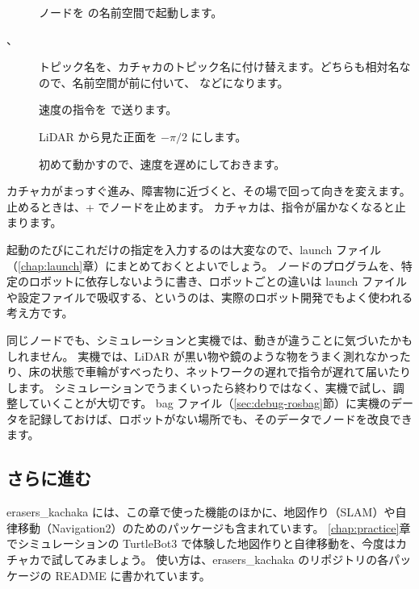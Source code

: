 \begin{description}
  \item[] ノードを  の名前空間で起動します。
  \item[、] トピック名を、カチャカのトピック名に付け替えます。どちらも相対名なので、名前空間が前に付いて、 などになります。
  \item[] 速度の指令を  で送ります。
  \item[] LiDAR から見た正面を $-\pi/2$ にします。
  \item[] 初めて動かすので、速度を遅めにしておきます。
\end{description}

カチャカがまっすぐ進み、障害物に近づくと、その場で回って向きを変えます。
止めるときは、+ でノードを止めます。
カチャカは、指令が届かなくなると止まります。

起動のたびにこれだけの指定を入力するのは大変なので、launch ファイル（\ref{chap:launch}章）にまとめておくとよいでしょう。
ノードのプログラムを、特定のロボットに依存しないように書き、ロボットごとの違いは launch ファイルや設定ファイルで吸収する、というのは、実際のロボット開発でもよく使われる考え方です。

\begin{point}[シミュレーションと実機の違い]
  同じノードでも、シミュレーションと実機では、動きが違うことに気づいたかもしれません。
  実機では、LiDAR が黒い物や鏡のような物をうまく測れなかったり、床の状態で車輪がすべったり、ネットワークの遅れで指令が遅れて届いたりします。
  シミュレーションでうまくいったら終わりではなく、実機で試し、調整していくことが大切です。
  bag ファイル（\ref{sec:debug-rosbag}節）に実機のデータを記録しておけば、ロボットがない場所でも、そのデータでノードを改良できます。
\end{point}

\subsection{さらに進む}

erasers\_kachaka には、この章で使った機能のほかに、地図作り（SLAM）や自律移動（Navigation2）のためのパッケージも含まれています。
\ref{chap:practice}章でシミュレーションの TurtleBot3 で体験した地図作りと自律移動を、今度はカチャカで試してみましょう。
使い方は、erasers\_kachaka のリポジトリの各パッケージの README に書かれています。

